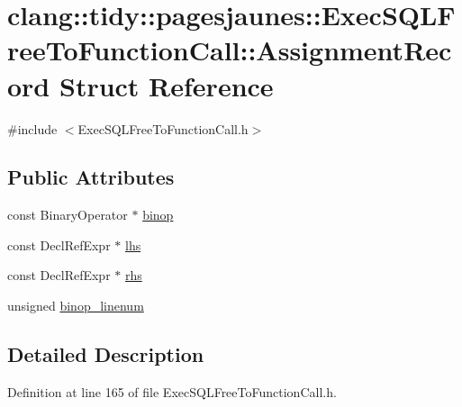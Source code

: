 \hypertarget{structclang_1_1tidy_1_1pagesjaunes_1_1_exec_s_q_l_free_to_function_call_1_1_assignment_record}{}\section{clang\+:\+:tidy\+:\+:pagesjaunes\+:\+:Exec\+S\+Q\+L\+Free\+To\+Function\+Call\+:\+:Assignment\+Record Struct Reference}
\label{structclang_1_1tidy_1_1pagesjaunes_1_1_exec_s_q_l_free_to_function_call_1_1_assignment_record}


{\ttfamily \#include $<$Exec\+S\+Q\+L\+Free\+To\+Function\+Call.\+h$>$}

\subsection*{Public Attributes}
\begin{DoxyCompactItemize}
\item 
const Binary\+Operator $\ast$ \hyperlink{structclang_1_1tidy_1_1pagesjaunes_1_1_exec_s_q_l_free_to_function_call_1_1_assignment_record_ad746cc2b0f727757ccf181c619c32305}{binop}
\item 
const Decl\+Ref\+Expr $\ast$ \hyperlink{structclang_1_1tidy_1_1pagesjaunes_1_1_exec_s_q_l_free_to_function_call_1_1_assignment_record_af20de84a7933c874739ae466f8a862b9}{lhs}
\item 
const Decl\+Ref\+Expr $\ast$ \hyperlink{structclang_1_1tidy_1_1pagesjaunes_1_1_exec_s_q_l_free_to_function_call_1_1_assignment_record_a4f0b7c67866f27b79a5d4056fe5f35f5}{rhs}
\item 
unsigned \hyperlink{structclang_1_1tidy_1_1pagesjaunes_1_1_exec_s_q_l_free_to_function_call_1_1_assignment_record_ae2b6fd110ef2c408cc3ea19c7bbfc426}{binop\+\_\+linenum}
\end{DoxyCompactItemize}


\subsection{Detailed Description}


Definition at line 165 of file Exec\+S\+Q\+L\+Free\+To\+Function\+Call.\+h.



